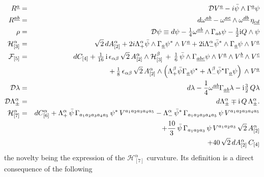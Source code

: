 \documentclass[a4paper,11pt]{article}
\newcommand{\ft}[2]{{\textstyle\frac{#1}{#2}}}
\begin{document}
\begin{eqnarray}
   R^{\underline{a}}&=&{\cal D} V^{\underline{a}}-i{\bar\psi}\wedge \Gamma^{\underline{a}}\psi \label{tors11}\\
   R^{\underline{ab}}&=&d \omega^{\underline{ab}}-\omega^{\underline{ac}} \wedge\omega^{\underline{db}} \,
   \eta_{\underline{cd}}\cr
   \rho&=&{\cal D} \psi \equiv d\psi- \ft 1 4  \omega^{\underline{ab}} \wedge \Gamma_{ab}\psi-
          \ft 1 2 {\rm i} Q \wedge \psi \label{lore11}\\
   \mathcal{H}^{\alpha}_{[3]} &=& \sqrt{2} \, dA^{\alpha}_{[2]}+2i\Lambda^{\alpha}_+ {\bar\psi}
   \wedge \Gamma_{\underline{a}} \psi^* \wedge V^{\underline{a}}
          +2{\rm i}\Lambda^{\alpha}_- {{\bar\psi}}^* \wedge
          \Gamma_{\underline{a}} \psi \wedge V^{\underline{a}}\label{2form11}\\
   \mathcal{F}_{[5]} &=& dC_{[4]}+\ft {1} {16} \, {\rm i} \,
   \epsilon_{\alpha\beta} \, \sqrt{2} \, A^{\alpha}_{[2]}  \wedge \mathcal{H}^\beta_{[3]} \,+\, \ft 1 6 \,
   {\bar\psi} \wedge
   \Gamma_{\underline{abc}}\psi \wedge V^{\underline{a}}  \wedge V^{\underline{b}} \wedge
   V^{\underline{c}}
    \nonumber\\
&& + \, \ft 1 8 \, \epsilon_{\alpha\beta} \, \sqrt{2} \, A^{\alpha}_{[2]}
\wedge\left( \Lambda^\beta_+ {\bar\psi} \Gamma_{\underline{a}} \psi^\star +
 \Lambda^\beta_- {\bar\psi}^\star \Gamma_{\underline{a}}
\psi\right) \,
 \wedge V^{\underline{a}} \label{4form11}\\
   {\cal D}\lambda &=& d\lambda-{1\over 4} \omega^{\underline{ab}} \Gamma_{\underline{ab}}\lambda
    -{\rm i}  \ft 3 2 \, Q\lambda \label{dilatin11} \\
  {\cal D}\Lambda^{\alpha}_\pm&=&d\Lambda^{\alpha}_{\pm} \mp
   {\rm i}  \, Q \, \Lambda^{\alpha}_{\pm}.\label{su11mc11} \\
\mathcal{H}^{\alpha}_{[7]} & = & dC_{[6]}^{\alpha} + \Lambda^{\alpha}_{+} \,
{\bar{\psi}} \, \Gamma_{a_1 a_2 a_3 a_4 a_5} \, \psi^{*} \,
V^{a_1 a_2 a_3 a_4 a_5} - \Lambda^{\alpha}_{-} \,
{\bar{\psi}}^{*} \, \Gamma_{a_1 a_2 a_3 a_4 a_5} \, \psi \,
V^{a_1 a_2 a_3 a_4 a_5}  \nonumber \\
&& + \frac{10}{3} \, {\bar{\psi}} \,
\Gamma_{a_1 a_2 a_3} \, \psi \, V^{a_1 a_2 a_3} \, \sqrt{2} \, A^{\alpha}_{[2]} \nonumber \\
&& + 40 \, \sqrt{2} \, dA^{\alpha}_{[2]} \, C_{[4]} \label{h7curva}
\end{eqnarray}
the novelty being the expression of the $\mathcal{H}^{\alpha}_{[7]}$
curvature. Its definition is a direct consequence of the following
\end{document}
